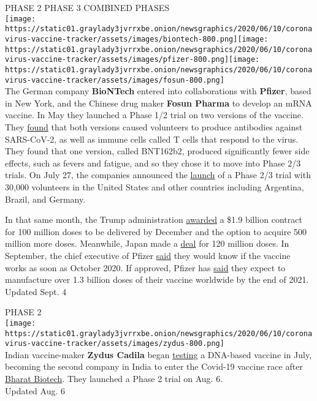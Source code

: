 PHASE 2 PHASE 3 COMBINED PHASES\\
\texttt{[image: https://static01.graylady3jvrrxbe.onion/newsgraphics/2020/06/10/coronavirus-vaccine-tracker/assets/images/biontech-800.png]}\texttt{[image: https://static01.graylady3jvrrxbe.onion/newsgraphics/2020/06/10/coronavirus-vaccine-tracker/assets/images/pfizer-800.png]}\texttt{[image: https://static01.graylady3jvrrxbe.onion/newsgraphics/2020/06/10/coronavirus-vaccine-tracker/assets/images/fosun-800.png]}\\
The German company \textbf{BioNTech} entered into collaborations with
\textbf{Pfizer}, based in New York, and the Chinese drug maker
\textbf{Fosun Pharma} to develop an mRNA vaccine. In May they launched a
Phase 1/2 trial on two versions of the vaccine. They
\href{https://doi.org/10.1101/2020.08.17.20176651}{found} that both
versions caused volunteers to produce antibodies against SARS-CoV-2, as
well as immune cells called T cells that respond to the virus. They
found that one version, called BNT162b2, produced significantly fewer
side effects, such as fevers and fatigue, and so they chose it to move
into Phase 2/3 trials. On July 27, the companies announced the
\href{https://www.businesswire.com/news/home/20200727005800/en/Pfizer-BioNTech-Choose-Lead-mRNA-Vaccine-Candidate}{launch}
of a Phase 2/3 trial with 30,000 volunteers in the United States and
other countries including Argentina, Brazil, and Germany.

In that same month, the Trump administration
\href{https://www.nytimes3xbfgragh.onion/2020/07/22/us/politics/pfizer-coronavirus-vaccine.html}{awarded}
a \$1.9 billion contract for 100 million doses to be delivered by
December and the option to acquire 500 million more doses. Meanwhile,
Japan made a
\href{https://www.pfizer.com/news/press-release/press-release-detail/pfizer-and-biontech-supply-japan-120-million-doses-their}{deal}
for 120 million doses. In September, the chief executive of Pfizer
\href{https://www.nytimes3xbfgragh.onion/reuters/2020/09/03/world/europe/03reuters-health-coronavirus-drugs.html}{said}
they would know if the vaccine works as soon as October 2020. If
approved, Pfizer has
\href{https://www.pfizer.com/news/press-release/press-release-detail/pfizer-and-biontech-supply-canada-their-bnt162-mrna-based}{said}
they expect to manufacture over 1.3 billion doses of their vaccine
worldwide by the end of 2021.\\
Updated Sept. 4

PHASE 2\\
\texttt{[image: https://static01.graylady3jvrrxbe.onion/newsgraphics/2020/06/10/coronavirus-vaccine-tracker/assets/images/zydus-800.png]}\\
Indian vaccine-maker \textbf{Zydus Cadila} began
\href{https://twitter.com/ZydusUniverse/status/1278997989382483968}{testing}
a DNA-based vaccine in July, becoming the second company in India to
enter the Covid-19 vaccine race after \protect\hyperlink{bharat}{Bharat
Biotech}. They launched a Phase 2 trial on Aug. 6.\\
Updated Aug. 6

